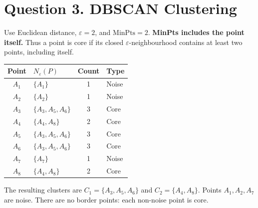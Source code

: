 \documentclass[11pt,a4paper]{article}
\begin{document}
\section*{Question 3. DBSCAN Clustering}
Use Euclidean distance, \(\varepsilon=2\), and \(\mathrm{MinPts}=2\). \textbf{MinPts includes the point itself.} Thus a point is core if its closed \(\varepsilon\)-neighbourhood contains at least two points, including itself.

\begin{center}
\small
\begin{tabular}{c|l|c|l}
\toprule
Point & \(N_\varepsilon(P)\) & Count & Type\\
\midrule
\(A_1\)&\(\{A_1\}\)&1&Noise\\
\(A_2\)&\(\{A_2\}\)&1&Noise\\
\(A_3\)&\(\{A_3,A_5,A_6\}\)&3&Core\\
\(A_4\)&\(\{A_4,A_8\}\)&2&Core\\
\(A_5\)&\(\{A_3,A_5,A_6\}\)&3&Core\\
\(A_6\)&\(\{A_3,A_5,A_6\}\)&3&Core\\
\(A_7\)&\(\{A_7\}\)&1&Noise\\
\(A_8\)&\(\{A_4,A_8\}\)&2&Core\\
\bottomrule
\end{tabular}
\end{center}
The resulting clusters are \(C_1=\{A_3,A_5,A_6\}\) and \(C_2=\{A_4,A_8\}\). Points \(A_1,A_2,A_7\) are noise. There are no border points: each non-noise point is core.
\end{document}
